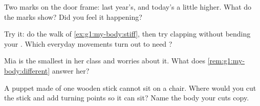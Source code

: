 \begin{exercise}[$\star$]\label{exo:g1:my-body:7}
Two marks on the door frame: last year's, and today's a little
higher. What do the marks show? Did you feel it happening?
\end{exercise}

\begin{exercise}[$\star$]\label{exo:g1:my-body:8}
Try it: do the  walk of \cref{ex:g1:my-body:stiff}, then
try clapping without bending your . Which everyday movements
turn out to need ?
\end{exercise}

\begin{exercise}[$\star\star$]\label{exo:g1:my-body:9}
Mia is the smallest in her class and worries about it. What does
\cref{rem:g1:my-body:different} answer her?
\end{exercise}

\begin{exercise}[$\star\star$]\label{exo:g1:my-body:10}
A puppet made of one wooden stick cannot sit on a chair. Where
would you cut the stick and add turning points so it can sit? Name
the body  your cuts copy.
\end{exercise}
